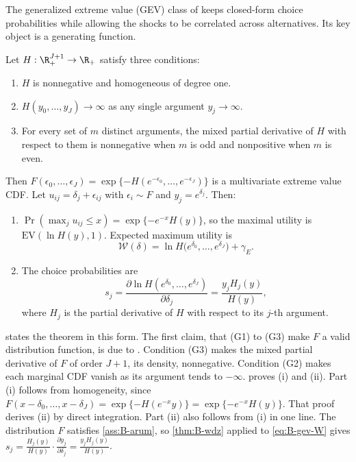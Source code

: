 The generalized extreme value (GEV) class of \citet{McFadden1978} keeps closed-form choice probabilities
while allowing the shocks to be correlated across alternatives. Its key object is a generating function.

\begin{theorem}\label{thm:B-gev}
Let $H : \R^{J+1}_+ \to \R_+$ satisfy three conditions:
\begin{enumerate}[label=(G\arabic*)]
\item $H$ is nonnegative and homogeneous of degree one.
\item $H(y_0, \dots, y_J) \to \infty$ as any single argument $y_j \to \infty$.
\item For every set of $m$ distinct arguments, the mixed partial derivative of $H$ with respect to them is
  nonnegative when $m$ is odd and nonpositive when $m$ is even.
\end{enumerate}
Then $F(\epsilon_0, \dots, \epsilon_J) = \exp\{-H(e^{-\epsilon_0}, \dots, e^{-\epsilon_J})\}$ is a multivariate extreme value CDF.
Let $u_{ij} = \delta_j + \epsilon_{ij}$ with $\epsilon_i \sim F$ and $y_j = e^{\delta_j}$. Then:
\begin{enumerate}[label=(\roman*)]
\item $\Pr(\max_ju_{ij} \leq x) = \exp\{-e^{-x}H(y)\}$, so the maximal utility is $\mathrm{EV}(\ln H(y), 1)$.
  Expected maximum utility is
  \begin{equation}\label{eq:B-gev-W}
  \mathcal{W}(\delta) = \ln H\big(e^{\delta_0}, \dots, e^{\delta_J}\big) + \gamma_E .
  \end{equation}
\item The choice probabilities are
  \begin{equation}\label{eq:B-gev-shares}
  s_j = \frac{\partial\ln H(e^{\delta_0}, \dots, e^{\delta_J})}{\partial\delta_j} = \frac{y_jH_j(y)}{H(y)},
  \end{equation}
  where $H_j$ is the partial derivative of $H$ with respect to its $j$-th argument.
\end{enumerate}
\end{theorem}

\citet[eqs.~3.29--3.31, p.~1421]{McFadden1984} states the theorem in this form. The first claim, that (G1) to
(G3) make $F$ a valid distribution function, is due to \citet{McFadden1978}. Condition (G3) makes the mixed
partial derivative of $F$ of order $J + 1$, its density, nonnegative. Condition (G2) makes each marginal CDF
vanish as its argument tends to $-\infty$.  proves (i) and (ii). Part (i) follows from
homogeneity, since $F(x - \delta_0, \dots, x - \delta_J) = \exp\{-H(e^{-x}y)\} = \exp\{-e^{-x}H(y)\}$. That proof
derives (ii) by direct integration. Part (ii) also follows from (i) in one line. The distribution $F$ satisfies
\cref{ass:B-arum}, so \cref{thm:B-wdz} applied to \eqref{eq:B-gev-W} gives
$s_j = \frac{H_j(y)}{H(y)}\cdot\frac{\partial y_j}{\partial\delta_j} = \frac{y_jH_j(y)}{H(y)}$.

